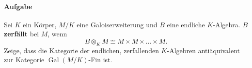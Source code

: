 \documentclass{article}
\begin{document}
    \paragraph*{Aufgabe} Sei $K$ ein Körper, $M/K$ eine Galoiserweiterung und $B$ eine endliche $K$-Algebra.
    $B$ \textbf{zerfällt} bei $M$, wenn
    \[
        B \otimes_K M \cong M \times M \times \dots \times M.
    \]
    Zeige, dass die Kategorie der endlichen, zerfallenden $K$-Algebren antiäquivalent zur Kategorie $\operatorname{Gal}(M/K)$-Fin ist.
\end{document}
